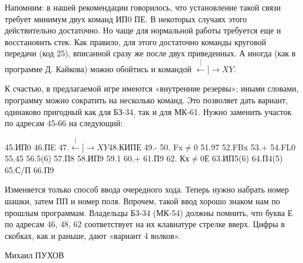 \documentclass[11pt,a4paper,oneside]{article}
\def\XY{$\stackrel[\leftarrow]{\rightarrow}{XY}$}
\begin{document}
Напомним: в нашей рекомендации говорилось, что установление такой связи требует минимум двух команд ИП0 ПЕ. В некоторых случаях этого действительно достаточно. Но чаще для нормальной работы требуется еще и восстановить стек. Как правило, для этого достаточно команды круговой передачи (код 25), вписанной сразу же после двух приведенных. А иногда (как в программе Д. Кайкова) можно обойтись и командой \XY.

К счастью, в предлагаемой игре имеются «внутренние резервы»; иными словами, программу можно сократить на несколько команд. Это позволяет дать вариант, одинаково пригодный как для БЗ-34, так и для МК-61. Нужно заменить участок по адресам 45-66 на следующий:

45.ИП0 46.ПE 47.\XY 48.КИПЕ 49.- 50. Fx$\neq$0 51.97 52.FBx 53.+ 54.FL0 55.45 56.5(6) 57.П8 58.ИП9 59.1 60.+ 61.П9 62. Кх$\neq$0Е 63.ИП5(6) 64.П4(5) 65.С/П 66.П9

Изменяется только способ ввода очередного хода. Теперь нужно набрать номер шашки, затем ПП и номер поля. Впрочем, такой ввод хорошо знаком нам по прошлым программам. Владельцы Б3-34 (МК-54) должны помнить, что буква Е по адресам 46, 48, 62 соответствует на их клавиатуре стрелке вверх. Цифры в скобках, как и раньше, дают «вариант 4 волков».

Михаил ПУХОВ
\end{document}
